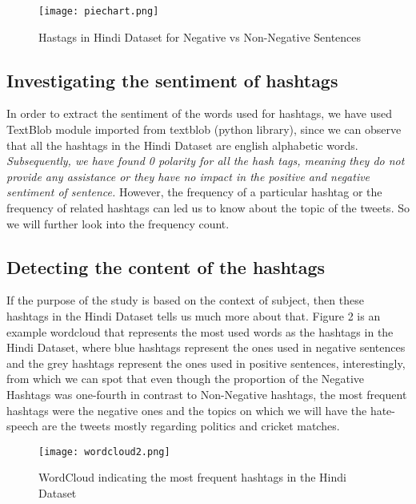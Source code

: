 \documentclass{article}
\begin{document}
\begin{figure}
  \centering
  
  \texttt{[image: piechart.png]}
  \caption{Hastags in Hindi Dataset for Negative vs Non-Negative Sentences}
\end{figure}

\subsection{Investigating the sentiment of hashtags}

In order to extract the sentiment of the words used for hashtags, we have used TextBlob module imported from textblob (python library), since we can observe that all the hashtags in the Hindi Dataset are english alphabetic words. \textit{Subsequently, we have found 0 polarity for all the hash tags, meaning they do not provide any assistance or they have no impact in the positive and negative sentiment of sentence.} However, the frequency of a particular hashtag or the frequency of related hashtags can led us to know about the topic of the tweets. So we will further look into the frequency count.

\subsection{Detecting the content of the hashtags}

If the purpose of the study is based on the context of subject, then these hashtags in the Hindi Dataset tells us much more about that. Figure 2 is an example wordcloud that represents the most used words as the hashtags in the Hindi Dataset, where blue hashtags represent the ones used in negative sentences and the grey hashtags represent the ones used in positive sentences, interestingly, from which we can spot that even though the proportion of the Negative Hashtags was one-fourth in contrast to Non-Negative hashtags, the most frequent hashtags were the negative ones and the topics on which we will have the hate-speech are the tweets mostly regarding politics and cricket matches.

\begin{figure}[b]
  \centering
  \texttt{[image: wordcloud2.png]}
  \caption{WordCloud indicating the most frequent hashtags in the Hindi Dataset}
\end{figure}
\end{document}
